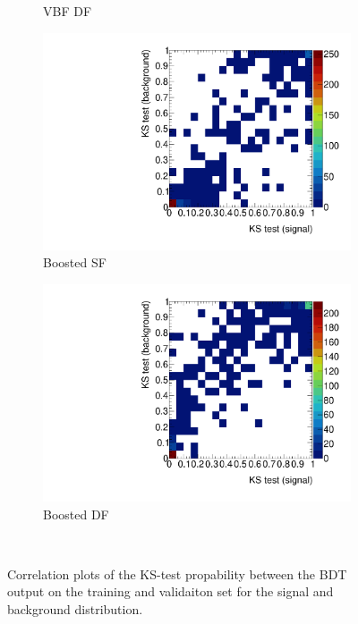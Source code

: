 \begin{figure}[htb]
\begin{subfigure}[t]{0.45\textwidth}
        \caption{VBF DF}
    \end{subfigure}
    \begin{subfigure}[t]{0.45\textwidth}
        \includegraphics[width=\textwidth]{./plots/mva/scan/BOOST_SF_ks_test_sig_vs_bkg.pdf}
        \caption{Boosted SF}
    \end{subfigure}
    \begin{subfigure}[t]{0.45\textwidth}
        \includegraphics[width=\textwidth]{./plots/mva/scan/BOOST_DF_ks_test_sig_vs_bkg.pdf}
        \caption{Boosted DF}
    \end{subfigure}
    \caption{Correlation plots of the KS-test propability between the BDT output on the training and validaiton set for the signal and background distribution.}~\label{fig:mva:scan:kstest}
\end{figure}


